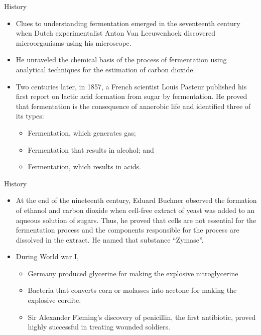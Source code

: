 \documentclass[ignorenonframetext,aspectratio=169]{beamer}
\providecommand{\tightlist}{%
  \setlength{\itemsep}{0pt}\setlength{\parskip}{0pt}}
\begin{document}
\begin{frame}{History}
\protect\hypertarget{history-2}{}

\begin{itemize}
\tightlist
\item
  Clues to understanding fermentation emerged in the seventeenth century
  when Dutch experimentalist Anton Van Leeuwenhoek discovered
  microorganisms using his microscope.
\item
  He unraveled the chemical basis of the process of fermentation using
  analytical techniques for the estimation of carbon dioxide.
\item
  Two centuries later, in 1857, a French scientist Louis Pasteur
  published his first report on lactic acid formation from sugar by
  fermentation. He proved that fermentation is the consequence of
  anaerobic life and identified three of its types:

  \begin{itemize}
  \tightlist
  \item
    Fermentation, which generates gas;
  \item
    Fermentation that results in alcohol; and
  \item
    Fermentation, which results in acids.
  \end{itemize}
\end{itemize}

\end{frame}

\begin{frame}{History}
\protect\hypertarget{history-3}{}

\begin{itemize}
\tightlist
\item
  At the end of the nineteenth century, Eduard Buchner observed the
  formation of ethanol and carbon dioxide when cell-free extract of
  yeast was added to an aqueous solution of sugars. Thus, he proved that
  cells are not essential for the fermentation process and the
  components responsible for the process are dissolved in the extract.
  He named that substance ``Zymase''.
\item
  During World war I,

  \begin{itemize}
  \tightlist
  \item
    Germany produced glycerine for making the explosive nitroglycerine
  \item
    Bacteria that converts corn or molasses into acetone for making the
    explosive cordite.
  \item
    Sir Alexander Fleming's discovery of penicillin, the first
    antibiotic, proved highly successful in treating wounded soldiers.
  \end{itemize}
\end{itemize}

\end{frame}
\end{document}
